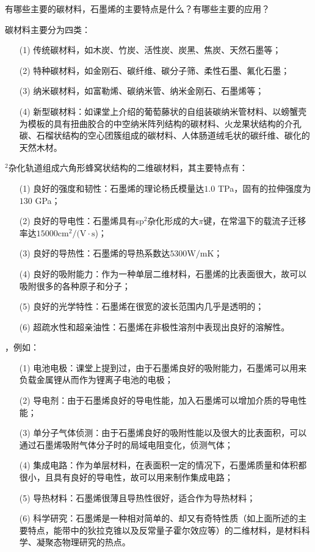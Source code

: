 \documentclass{assignment}
\begin{document}
\begin{ti}
    有哪些主要的碳材料，石墨烯的主要特点是什么？有哪些主要的应用？
\end{ti}
\begin{da}
    碳材料主要分为四类：
    \begin{itemize}
        \item[(1)] 传统碳材料，如木炭、竹炭、活性炭、炭黑、焦炭、天然石墨等；
        \item[(2)] 特种碳材料，如金刚石、碳纤维、碳分子筛、柔性石墨、氟化石墨；
        \item[(3)] 纳米碳材料，如富勒烯、碳纳米管、纳米金刚石、石墨烯等；
        \item[(4)] 新型碳材料：如课堂上介绍的葡萄藤状的自组装碳纳米管材料、以螃蟹壳为模板的具有扭曲胶合的中空纳米阵列结构的碳材料、火龙果状结构的介孔碳、石榴状结构的空心团簇组成的碳材料、人体肠道绒毛状的碳纤维、碳化的天然木材。
    \end{itemize}

    $^2$杂化轨道组成六角形蜂窝状结构的二维碳材料，其主要特点有：
    \begin{itemize}
        \item[(1)] 良好的强度和韧性：石墨烯的理论杨氏模量达$1.0$ TPa，固有的拉伸强度为$130$ GPa；
        \item[(2)] 良好的导电性：石墨烯具有sp$^2$杂化形成的大$\pi$键，在常温下的载流子迁移率达$15000\mathrm{cm}^2/(\mathrm{V}\cdot\mathrm{s}$)；
        \item[(3)] 良好的导热性：石墨烯的导热系数达$5300\mathrm{W}/\mathrm{mK}$；
        \item[(4)] 良好的吸附能力：作为一种单层二维材料，石墨烯的比表面很大，故可以吸附很多的各种原子和分子；
        \item[(5)] 良好的光学特性：石墨烯在很宽的波长范围内几乎是透明的；
        \item[(6)] 超疏水性和超亲油性：石墨烯在非极性溶剂中表现出良好的溶解性。
    \end{itemize}

    ，例如：
    \begin{itemize}
        \item[(1)] 电池电极：课堂上提到过，由于石墨烯良好的吸附能力，石墨烯可以用来负载金属锂从而作为锂离子电池的电极；
        \item[(2)] 导电剂：由于石墨烯良好的导电性能，加入石墨烯可以增加介质的导电性能；
        \item[(3)] 单分子气体侦测：由于石墨烯良好的吸附性能以及很大的比表面积，可以通过石墨烯吸附气体分子时的局域电阻变化，侦测气体；
        \item[(4)] 集成电路：作为单层材料，在表面积一定的情况下，石墨烯质量和体积都很小，且具有良好的导电性，故可以用来制作集成电路；
        \item[(5)] 导热材料：石墨烯很薄且导热性很好，适合作为导热材料；
        \item[(6)] 科学研究：石墨烯是一种相对简单的、却又有奇特性质（如上面所述的主要特点，能带中的狄拉克锥以及反常量子霍尔效应等）的二维材料，是材料科学、凝聚态物理研究的热点。
    \end{itemize}
\end{da}
\end{document}
